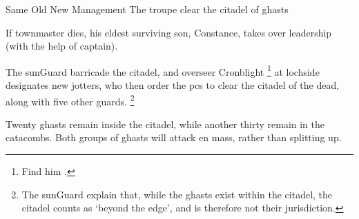 {Same Old New Management}%
{The troupe clear the citadel of ghasts}%

If \gls{townmaster} dies, his eldest surviving son, Constance, takes over leadership (with the help of \gls{captain}).

The \gls{sunGuard} barricade the citadel, and \gls{overseer} Cronblight%
\footnote{Find him .}
at \gls{lochside} designates new \glspl{jotter}, who then order the \glspl{pc} to clear the citadel of the dead, along with five other \glspl{guard}.%
\footnote{The \gls{sunGuard} explain that, while the ghasts exist within the citadel, the citadel counts as `beyond the \gls{edge}', and is therefore not their jurisdiction.}

Twenty ghasts remain inside the citadel, while another thirty remain in the catacombs.
Both groups of ghasts will attack en mass, rather than splitting up.

